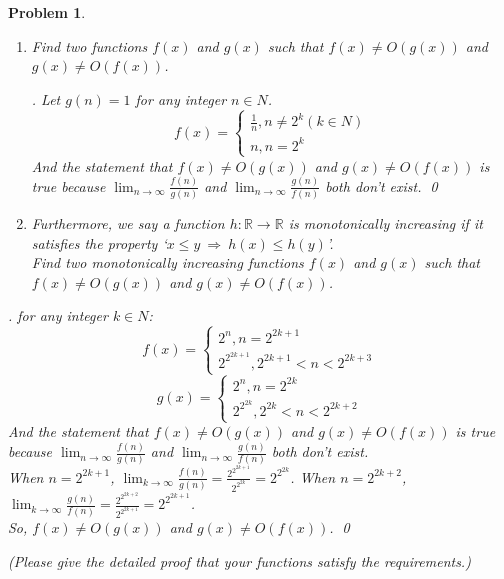 \documentclass[12pt]{article}
\newtheorem{hw}{Problem}
\newenvironment{sol}
  {\par\vspace{3mm}\noindent{\it Solution}.}
  {\qed}
\begin{document}
\begin{hw}
\begin{enumerate}
\item Find two functions $f(x)$ and $g(x)$ such that $f(x)\neq O(g(x))$ and $g(x)\neq O(f(x))$.

\begin{sol}
    Let $g(n)=1$ for any integer $n\in N$.
     $$ f(x)=\left\{
        \begin{aligned}
        \frac{1}{n},n\neq 2^k(k\in N) \\
        n,n=2^k 
        \end{aligned}
        \right.
        $$
    And the statement that $f(x)\neq O(g(x))$ and $g(x)\neq O(f(x))$ is true because $\lim_{n \to \infty} \frac{f(n)}{g(n)} $ and $\lim_{n \to \infty} \frac{g(n)}{f(n)} $ both don't exist.
\end{sol}

\item Furthermore, we say a function $h:\mathbb{R}\rightarrow \mathbb{R}$ is \emph{monotonically increasing} if it satisfies the property `$x\leq y ~\Rightarrow~ h(x)\leq h(y)$'.
 \\
 Find two monotonically increasing functions $f(x)$ and $g(x)$ such that $f(x)\neq O(g(x))$ and $g(x)\neq O(f(x))$.
 \end{enumerate}

\begin{sol}
    for any integer $k\in N$:
        $$ f(x)=\left\{
        \begin{aligned}
        2^n,n=2^{2k+1} \\
        2^{2^{2k+1}},2^{2k+1}<n<2^{2k+3} 
        \end{aligned}
        \right.
        $$
        $$ g(x)=\left\{
        \begin{aligned}
        2^n,n=2^{2k} \\
        2^{2^{2k}},2^{2k}<n<2^{2k+2} 
        \end{aligned}
        \right.
        $$
        And the statement that $f(x)\neq O(g(x))$ and $g(x)\neq O(f(x))$ is true because $\lim_{n \to \infty} \frac{f(n)}{g(n)} $ and $\lim_{n \to \infty} \frac{g(n)}{f(n)} $ both don't exist.\\
        When $n=2^{2k+1}$, $\lim_{k \to \infty} \frac{f(n)}{g(n)}= \frac{2^{2^{2k+1}}}{2^{2^{2k}}}=2^{2^{2k}} $.
        When $n=2^{2k+2}$, $\lim_{k \to \infty} \frac{g(n)}{f(n)}= \frac{2^{2^{2k+2}}}{2^{2^{2k+1}}}=2^{2^{2k+1}} $.\\
        So, $f(x)\neq O(g(x))$ and $g(x)\neq O(f(x))$.
 \end{sol}

 \vspace{2mm}
    (Please give the detailed proof that your functions satisfy the requirements.)
\end{hw}
\end{document}
